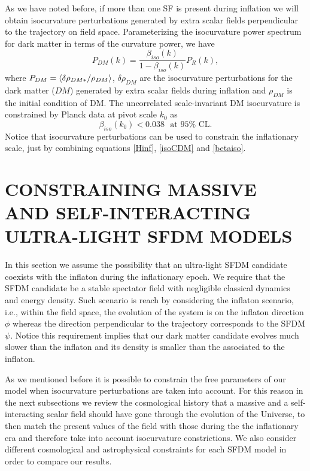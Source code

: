 \documentclass[amssymb,twocolumn,prd,nofootinbib,showpacs]{revtex4-1}
\begin{document}
As we have noted before, if more than one SF is present during inflation we will obtain isocurvature 
perturbations generated by extra scalar fields perpendicular to the trajectory on field space. 
%
Parameterizing the isocurvature power spectrum for dark matter in terms of the curvature power, we have
%
\begin{equation}\label{isoCDM}
P_{DM}(k) = \frac{\beta_{iso}(k)}{1-\beta_{iso}(k)}P_R(k),
\end{equation}
%
where $P_{DM}=\braket{\delta \rho_{DM*}/\rho_{DM}}$, $\delta\rho_{DM}$ are the isocurvature 
perturbations for the dark matter ($DM$) generated by extra scalar fields during inflation and $\rho_{DM}$ 
is the initial condition of DM. 
The uncorrelated scale-invariant DM isocurvature is constrained by Planck data \cite{const1,const2} 
at pivot scale $k_0$ as
%
\begin{equation}\label{betaiso}
\beta_{iso}(k_0)<0.038 \ \ \ \text{at $95\%$ CL}.
\end{equation}
%
Notice that isocurvature perturbations can be used to constrain the inflationary scale, 
just by combining equations \eqref{Hinf}, \eqref{isoCDM} and \eqref{betaiso}.
%
%
%
\section{CONSTRAINING MASSIVE AND
SELF-INTERACTING ULTRA-LIGHT SFDM
MODELS}\label{simplest}
In this section we assume the possibility that an ultra-light  SFDM  candidate  coexists  with  the  inflaton  
during the inflationary epoch.  We require that the SFDM candidate be a stable spectator field with negligible 
classical dynamics and energy density. Such scenario is reach by considering the inflaton scenario, i.e., within the 
field space, the evolution of the system is on the inflaton direction $\phi$ whereas the direction perpendicular to the 
trajectory corresponds to the SFDM $\psi$. Notice  this requirement implies that our dark matter candidate evolves 
much slower than the inflaton and its density is smaller than the associated to the inflaton. 

As we mentioned before it is possible to constrain the free parameters of our model when isocurvature perturbations 
are taken into account.  For this reason in the next subsections we review the cosmological history that a massive 
and a self-interacting scalar field should have gone through the evolution  of  the  Universe,  
to then match the present values of the field with those during the the inflationary era and therefore
take into account isocurvature constrictions. We also consider different cosmological  and  astrophysical  
constraints  for each SFDM model in order to compare our results.  
\end{document}

